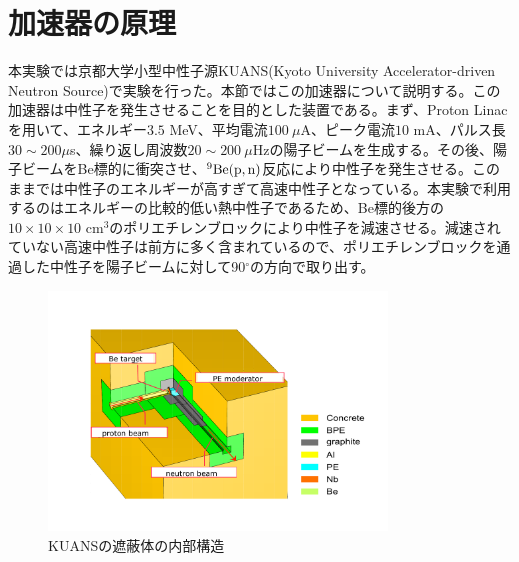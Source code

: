 
%

\section{加速器の原理}

本実験では京都大学小型中性子源KUANS(Kyoto University Accelerator-driven Neutron Source)で実験を行った。本節ではこの加速器について説明する。この加速器は中性子を発生させることを目的とした装置である。まず、Proton Linacを用いて、エネルギー$3.5$ MeV、平均電流$100\ \mu$A、ピーク電流$10$ mA、パルス長$30\sim200 \mu$s、繰り返し周波数$20\sim200\ \mu$Hzの陽子ビームを生成する。その後、陽子ビームをBe標的に衝突させ、$^9\rm{Be(p,n)}$反応により中性子を発生させる。このままでは中性子のエネルギーが高すぎて高速中性子となっている。本実験で利用するのはエネルギーの比較的低い熱中性子であるため、Be標的後方の$10\times10\times10$ cm$^3$のポリエチレンブロックにより中性子を減速させる。減速されていない高速中性子は前方に多く含まれているので、ポリエチレンブロックを通過した中性子を陽子ビームに対して90$^{\circ}$の方向で取り出す。

\begin{figure}
\begin{center}
\includegraphics[width=9cm]{accelerator/kuans_inner.pdf}
\caption{KUANSの遮蔽体の内部構造} \label{kuans_inner}
\end{center}
\end{figure}

%
